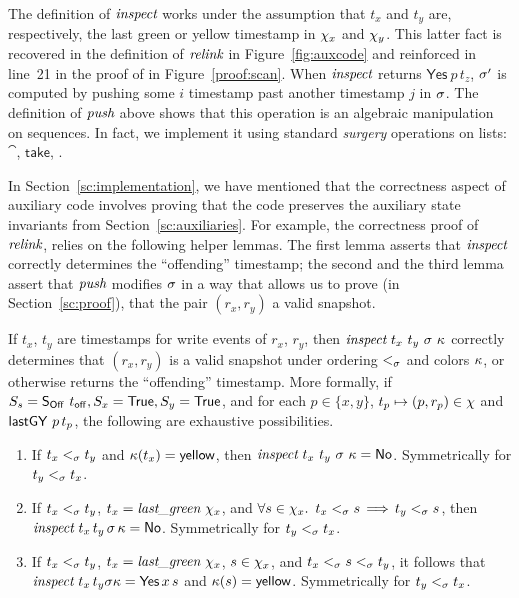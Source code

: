 The definition of $\textit{inspect}$ works under the assumption that
$t_x$ and $t_y$ are, respectively, the last green or yellow timestamp
in $\chi_x$ and $\chi_y$. This latter fact is recovered in the
definition of $\textit{relink}$ in Figure~\ref{fig:auxcode} and
reinforced in line~21 in the proof of {\jyscan} in
Figure~\ref{proof:scan}. When $\textit{inspect}$ returns
$\mathsf{Yes}\ p\, t_z$, $\sigma'$ is computed by pushing some $i$
timestamp past another timestamp $j$ in $\sigma$. The definition of
$\textit{push}$ above shows that this operation is an algebraic
manipulation on sequences. In fact, we implement it using standard
{\it surgery} operations on lists: $\cat$, $\mathsf{take}$, \etc.

In Section~\ref{sc:implementation}, we have mentioned that the
correctness aspect of auxiliary code involves proving that the code
preserves the auxiliary state invariants from
Section~\ref{sc:auxiliaries}. For example, the correctness proof of
$\textit{relink}$, relies on the following helper lemmas. The first lemma
asserts that $\textit{inspect}$ correctly determines the ``offending''
timestamp; the second and the third lemma assert that $\textit{push}$
modifies $\sigma$ in a way that allows us to prove (in
Section~\ref{sc:proof}), that the pair $(r_x, r_y)$ a valid snapshot.

\begin{lemma}\label{lem:inspect}
If $t_x$, $t_y$ are timestamps for write events of $r_x$, $r_y$, then
$\aux{inspect}\ t_x\ t_y\ \ordlist\ \C$ correctly determines that
$(r_x, r_y)$ is a valid snapshot under ordering $\mathrel{<_\sigma}$ and colors
$\kappa$, or otherwise returns the ``offending'' timestamp. More formally,
if $\sss = \sOff\ \toff, \sx =\TT, \sy =\TT$, and for each $p \in
\{x,y\}$, $ t_p \mapsto (p, r_p) \in \chi$ and $\lgVy\ p\, t_p $, the
following are exhaustive possibilities.

\begin{enumerate}
 \item If $t_x \mathrel{<_\sigma} t_y$ and $ \kappa(t_x) = {\sf yellow}$, then
   $\textit{inspect}\ t_x\ t_y\ \sigma\ \kappa =
   \mathsf{No}$. Symmetrically for $t_y \mathrel{<_\sigma} t_x$.

 \item If $ t_x \mathrel{<_\sigma} t_y $, $ t_x = \textit{last\_green}\ \chi_x$, and
       $\forall s \in \chi_x\mathord{.}\,\ t_x \mathrel{<_\sigma} s\,{\implies}\,t_y \mathrel{<_\sigma}
       s$, then \\ $\textit{inspect}\ t_x\, t_y\, \sigma\, \kappa
       = \mathsf{No}$. Symmetrically for $t_y \mathrel{<_\sigma} t_x$.

 \item If $ t_x <_{\sigma} t_y $, $ t_x = \textit{last\_green}\ \chi_x
   $, $s \in \chi_x$, and $t_x \mathrel{<_\sigma} s \mathrel{<_\sigma} t_y$, it follows that
   $\textit{inspect}\ t_x\, t_y \sigma \kappa = \mathsf{Yes}\, x\, s$ and
   $\kappa(s) = {\sf yellow}$. Symmetrically for $t_y \mathrel{<_\sigma} t_x$.
\end{enumerate}
\end{lemma}

